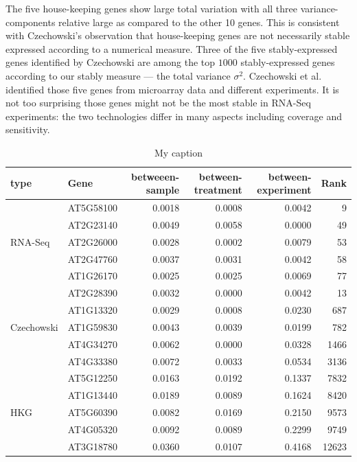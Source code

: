 \documentclass[11pt, a4paper]{article}
\begin{document}
The five house-keeping genes show large total variation with all three
variance-components relative large as compared to the other 10 genes. This is
consistent with Czechowski's observation that house-keeping genes are not necessarily stable
expressed according to a numerical measure. Three of the five
stably-expressed genes identified by Czechowski are among the top $1000$
stably-expressed genes according to our stably measure --- the total variance $\sigma^2$. Czechowski et al.
identified those five genes from microarray data and different experiments. It
is not too surprising those genes might not be the most stable in RNA-Seq
experiments: the two technologies differ in many aspects including coverage
and sensitivity. 

\begin{table}[]
	\centering
	\caption{My caption}
	\label{table:15genes}
	\begin{tabular}{llrrrr}
		type                        & Gene      & betweeen-sample & between-treatment & between-experiment & Rank  \\  \hline
		\multirow{5}{*}{RNA-Seq}    & AT5G58100 & 0.0018          & 0.0008            & 0.0042             & 9     \\
		& AT2G23140 & 0.0049          & 0.0058            & 0.0000             & 49    \\
		& AT2G26000 & 0.0028          & 0.0002            & 0.0079             & 53    \\
		& AT2G47760 & 0.0037          & 0.0031            & 0.0042             & 58    \\
		& AT1G26170 & 0.0025          & 0.0025            & 0.0069             & 77    \\  \hline
		\multirow{5}{*}{Czechowski} & AT2G28390 & 0.0032          & 0.0000            & 0.0042             & 13    \\
		& AT1G13320 & 0.0029          & 0.0008            & 0.0230             & 687   \\
		& AT1G59830 & 0.0043          & 0.0039            & 0.0199             & 782   \\
		& AT4G34270 & 0.0062          & 0.0000            & 0.0328             & 1466  \\
		& AT4G33380 & 0.0072          & 0.0033            & 0.0534             & 3136  \\   \hline
	 \multirow{5}{*}{HKG}              & AT5G12250 & 0.0163          & 0.0192            & 0.1337             & 7832  \\   
		& AT1G13440 & 0.0189          & 0.0089            & 0.1624             & 8420  \\
		& AT5G60390 & 0.0082          & 0.0169            & 0.2150             & 9573  \\
		& AT4G05320 & 0.0092          & 0.0089            & 0.2299             & 9749  \\
		& AT3G18780 & 0.0360          & 0.0107            & 0.4168             & 12623  \\   \hline
	\end{tabular}
\end{table}
\end{document}
